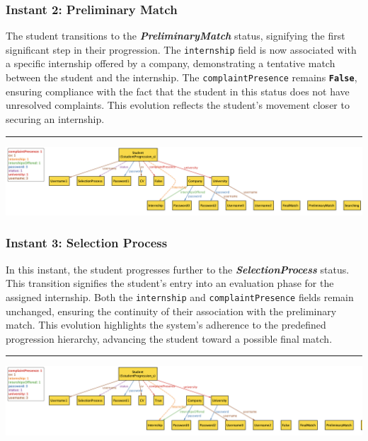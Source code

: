 \subsubsection*{Instant 2: Preliminary Match}
The student transitions to the \textbf{\textit{PreliminaryMatch}} status, signifying the first significant step in their progression. The \texttt{internship} field is now associated with a specific internship offered by a company, demonstrating a tentative match between the student and the internship. The \texttt{complaintPresence} remains \textbf{\texttt{False}}, ensuring compliance with the fact that the student in this status does not have unresolved complaints. This evolution reflects the student's movement closer to securing an internship.
\\
\hrule
\vspace{5mm}
\includegraphics[width=\textwidth]{a3.png}

\subsubsection*{Instant 3: Selection Process}
In this instant, the student progresses further to the \textbf{\textit{SelectionProcess}} status. This transition signifies the student's entry into an evaluation phase for the assigned internship. Both the \texttt{internship} and \texttt{complaintPresence} fields remain unchanged, ensuring the continuity of their association with the preliminary match. This evolution highlights the system's adherence to the predefined progression hierarchy, advancing the student toward a possible final match.
\\
\hrule
\vspace{5mm}
\includegraphics[width=\textwidth]{a4.png}

